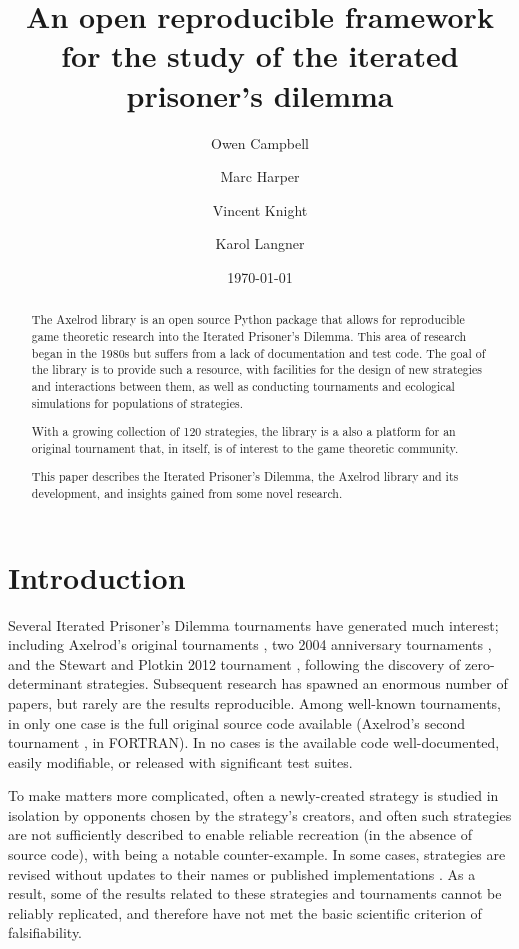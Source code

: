 \documentclass{article}
\title{An open reproducible framework for the study of the iterated prisoner's
dilemma}
\author{Owen Campbell\\
        \and
        Marc Harper\\
        \and
        Vincent Knight\\
        \and
        Karol Langner\\
}
\date{\today}
\begin{document}
\maketitle

\begin{abstract}
\noindent
    The Axelrod library is an open source Python package that allows for
    reproducible game theoretic research into the Iterated Prisoner's Dilemma.
    This area of research began in the 1980s but suffers from a lack of
    documentation and test code. The goal of the library is to provide such
    a resource, with facilities for the design of new strategies and
    interactions between them, as well as conducting tournaments and ecological
    simulations for populations of strategies.

\noindent
    With a growing collection of 120 strategies, the library is a also a
    platform for an original tournament that, in itself, is of interest to the
    game theoretic community.

\noindent
    This paper describes the Iterated Prisoner's Dilemma, the Axelrod library
    and its development, and insights gained from some novel research.
\end{abstract}


\section{Introduction}\label{sec:introduction}

Several Iterated Prisoner's Dilemma tournaments have generated much interest;
including Axelrod's original tournaments \cite{Axelrod1980a,Axelrod1980b},
two 2004 anniversary tournaments \cite{kendall2007iterated}, and
the Stewart and Plotkin 2012 tournament \cite{Stewart2012}, following the
discovery of zero-determinant strategies.  Subsequent research has spawned an
enormous number of papers, but rarely are the results reproducible. Among
well-known tournaments, in only one case is the full original source code
available (Axelrod's second tournament \cite{Axelrod1980b}, in FORTRAN). In no
cases is the available code well-documented, easily modifiable, or released with
significant test suites.

To make matters more complicated, often a newly-created strategy is studied in
isolation by opponents chosen by the strategy's creators, and often such
strategies are not sufficiently described to enable reliable recreation
(in the absence of source code), with \cite{slany2007some} being a notable
counter-example. In some cases, strategies are revised without updates to their
names or published implementations \cite{li2007design, li2011engineering}.
As a result, some of the results related to these strategies and tournaments
cannot be reliably replicated, and therefore have not met the basic scientific
criterion of falsifiability.
\end{document}
